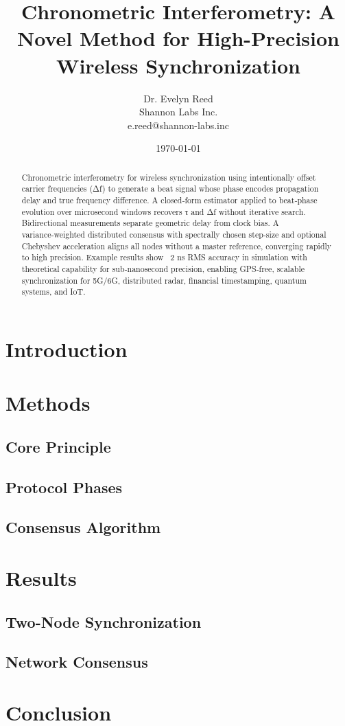 \documentclass{article}
\title{Chronometric Interferometry: A Novel Method for High-Precision Wireless Synchronization}
\author{Dr. Evelyn Reed \\ Shannon Labs Inc. \\ e.reed@shannon-labs.inc}
\date{\today}
\begin{document}
\maketitle

\begin{abstract}
Chronometric interferometry for wireless synchronization using intentionally offset carrier frequencies (Δf) to generate a beat signal whose phase encodes propagation delay and true frequency difference. A closed‑form estimator applied to beat‑phase evolution over microsecond windows recovers τ and Δf without iterative search. Bidirectional measurements separate geometric delay from clock bias. A variance‑weighted distributed consensus with spectrally chosen step‑size and optional Chebyshev acceleration aligns all nodes without a master reference, converging rapidly to high precision. Example results show ~2 ns RMS accuracy in simulation with theoretical capability for sub‑nanosecond precision, enabling GPS‑free, scalable synchronization for 5G/6G, distributed radar, financial timestamping, quantum systems, and IoT.
\end{abstract}

\section{Introduction}

\section{Methods}

\subsection{Core Principle}

\subsection{Protocol Phases}

\subsection{Consensus Algorithm}

\section{Results}

\subsection{Two-Node Synchronization}

\subsection{Network Consensus}

\section{Conclusion}



\end{document}
